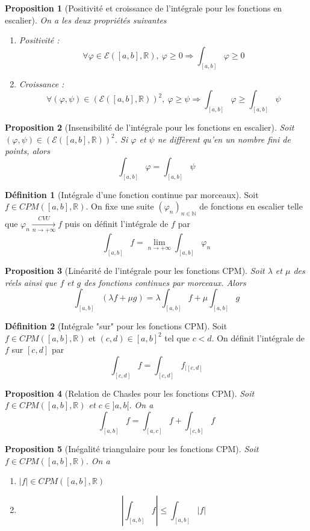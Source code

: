 \documentclass[french]{book}
\newcommand{\N}{\mathbb{N}}
\newcommand{\R}{\mathbb{R}}
\theoremstyle{plain}
\newtheorem{prop}{Proposition}[chapter]
\theoremstyle{definition}
\newtheorem{dfn}{Définition}[chapter]
\theoremstyle{remark}
\begin{document}
\begin{prop}[Positivité et croissance de l'intégrale pour les fonctions en escalier]
	On a les deux propriétés suivantes 
	\begin{enumerate}
		\item Positivité : $$\forall\varphi\in\mathcal{E}([a,b],\R),\ \varphi\geqslant 0 \Rightarrow \int_{[a,b]}\varphi \geqslant 0$$
		\item Croissance :$$\forall(\varphi,\psi)\in(\mathcal{E}([a,b],\R))^2,\ \varphi\geqslant \psi \Rightarrow \int_{[a,b]}\varphi \geqslant \int_{[a,b]}\psi$$
	\end{enumerate}
\end{prop}
\begin{prop}[Insensibilité de l'intégrale pour les fonctions en escalier]
	Soit $(\varphi,\psi)\in(\mathcal{E}([a,b],\R))^2$. Si $\varphi$ et $\psi$ ne diffèrent qu'en un nombre fini de points, alors $$\int_{[a,b]}\varphi = \int_{[a,b]}\psi$$
\end{prop}
\begin{dfn}[Intégrale d'une fonction continue par morceaux]
	Soit $f\in CPM([a,b],\R)$. On fixe une suite $(\varphi_n)_{n\in\N}$ de fonctions en escalier telle que $\varphi_n \xrightarrow[n\to+\infty]{CVU} f$ puis on définit l'intégrale de $f$ par $$\int_{[a,b]}f=\underset{n\to+\infty}{\lim}\int_{[a,b]}\varphi_n$$
\end{dfn}
\begin{prop}[Linéarité de l'intégrale pour les fonctions CPM]
	Soit $\lambda$ et $\mu$ des réels ainsi que $f$ et $g$ des fonctions continues par morceaux. Alors $$\int_{[a,b]}(\lambda f+\mu g)=\lambda\int_{[a,b]}f + \mu\int_{[a,b]}g$$
\end{prop}
\begin{dfn}[Intégrale "sur" pour les fonctions CPM]
	Soit $f\in CPM([a,b],\R)$ et $(c,d)\in[a,b]^2$ tel que $c<d$. On définit l'intégrale de $f$ sur $[c,d]$ par $$\int_{[c,d]}f=\int_{[c,d]}f_{|[c,d]}$$
\end{dfn}
\begin{prop}[Relation de Chasles pour les fonctions CPM]
	Soit $f\in CPM([a,b],\R)$ et $c\in]a,b[$. On a $$\int_{[a,b]}f=\int_{[a,c]}f+\int_{[c,b]}f$$
\end{prop}
\begin{prop}[Inégalité triangulaire pour les fonctions CPM]
	Soit $f\in CPM([a,b],\R)$. On a
	\begin{enumerate}
		\item $|f|\in CPM([a,b],\R)$
		\item $$\left\lvert\int_{[a,b]}f\right\rvert \leqslant \int_{[a,b]}\lvert f\rvert$$
	\end{enumerate}
\end{prop}
\end{document}
